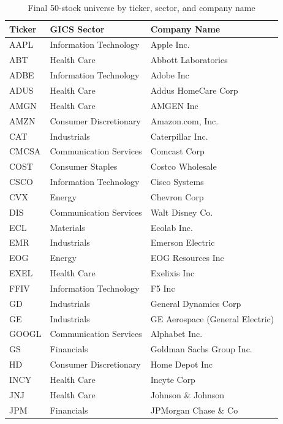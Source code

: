 \documentclass[11pt]{article}
\begin{document}
\begin{table}[H]
\centering
\caption{Final 50-stock universe by ticker, sector, and company name}
\small
\begin{tabular}{lll}
\toprule
Ticker & GICS Sector & Company Name \\
\midrule
AAPL  & Information Technology  & Apple Inc. \\
ABT   & Health Care             & Abbott Laboratories \\
ADBE  & Information Technology  & Adobe Inc \\
ADUS  & Health Care             & Addus HomeCare Corp \\
AMGN  & Health Care             & AMGEN Inc \\
AMZN  & Consumer Discretionary  & Amazon.com, Inc. \\
CAT   & Industrials             & Caterpillar Inc. \\
CMCSA & Communication Services  & Comcast Corp \\
COST  & Consumer Staples        & Costco Wholesale \\
CSCO  & Information Technology  & Cisco Systems \\
CVX   & Energy                  & Chevron Corp \\
DIS   & Communication Services  & Walt Disney Co. \\
ECL   & Materials               & Ecolab Inc. \\
EMR   & Industrials             & Emerson Electric \\
EOG   & Energy                  & EOG Resources Inc \\
EXEL  & Health Care             & Exelixis Inc \\
FFIV  & Information Technology  & F5 Inc \\
GD    & Industrials             & General Dynamics Corp \\
GE    & Industrials             & GE Aerospace (General Electric) \\
GOOGL & Communication Services  & Alphabet Inc. \\
GS    & Financials              & Goldman Sachs Group Inc. \\
HD    & Consumer Discretionary  & Home Depot Inc \\
INCY  & Health Care             & Incyte Corp \\
JNJ   & Health Care             & Johnson \& Johnson \\
JPM   & Financials              & JPMorgan Chase \& Co \\

\end{tabular}
\end{table}
\end{document}
